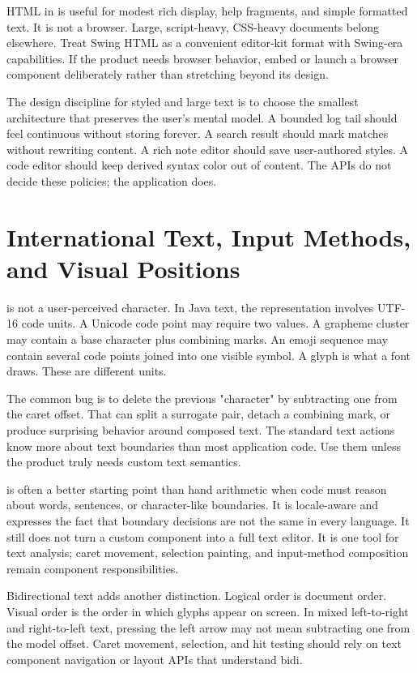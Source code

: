 HTML in  is useful for modest rich display, help fragments, and simple formatted text. It is not a browser. Large, script-heavy, CSS-heavy documents belong elsewhere. Treat Swing HTML as a convenient editor-kit format with Swing-era capabilities. If the product needs browser behavior, embed or launch a browser component deliberately rather than stretching  beyond its design.

The design discipline for styled and large text is to choose the smallest architecture that preserves the user's mental model. A bounded log tail should feel continuous without storing forever. A search result should mark matches without rewriting content. A rich note editor should save user-authored styles. A code editor should keep derived syntax color out of content. The APIs do not decide these policies; the application does.

\section{International Text, Input Methods, and Visual Positions}

 is not a user-perceived character. In Java text, the representation involves UTF-16 code units. A Unicode code point may require two  values. A grapheme cluster may contain a base character plus combining marks. An emoji sequence may contain several code points joined into one visible symbol. A glyph is what a font draws. These are different units.

The common bug is to delete the previous "character" by subtracting one from the caret offset. That can split a surrogate pair, detach a combining mark, or produce surprising behavior around composed text. The standard text actions know more about text boundaries than most application code. Use them unless the product truly needs custom text semantics.

 is often a better starting point than hand arithmetic when
code must reason about words, sentences, or character-like boundaries. It is
locale-aware and expresses the fact that boundary decisions are not the same in
every language. It still does not turn a custom component into a full text
editor. It is one tool for text analysis; caret movement, selection painting,
and input-method composition remain component responsibilities.

Bidirectional text adds another distinction. Logical order is document order. Visual order is the order in which glyphs appear on screen. In mixed left-to-right and right-to-left text, pressing the left arrow may not mean subtracting one from the model offset. Caret movement, selection, and hit testing should rely on text component navigation or layout APIs that understand bidi.

